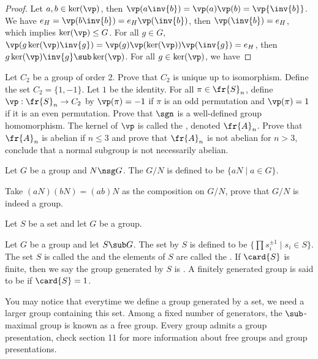 \documentclass[10pt]{article}
\begin{document}
\begin{proof}
    Let $a,b\in\ker(\vp)$, then $\vp(a\inv{b})=\vp(a)\vp(b)=\vp{\inv{b}}$. We have ${e}_{H}=\vp(b\inv{b})={e}_{H}\vp(\inv{b})$, then $\vp({\inv{b}})={e}_{H}$, which implies $\ker(\vp)\le G$. For all $g\in G$, $\vp(g\ker(\vp)\inv{g})=\vp(g)\vp(\ker(\vp))\vp(\inv{g})={e}_{H}$, then $g\ker(\vp)\inv{g}\sub\ker(\vp)$. For all $g\in\ker(\vp)$, we have 
\end{proof}
\begin{problem}
    Let ${C}_{2}$ be a group of order 2. Prove that ${C}_{2}$ is unique up to isomorphism. Define the set ${C}_{2}=\{1,-1\}$. Let $1$ be the identity. For all $\pi\in{\fr{S}}_{n}$, define $\vp:{\fr{S}}_{n}\to{C}_{2}$ by $\vp(\pi)=-1$ if $\pi$ is an odd permutation and $\vp(\pi)=1$ if it is an even permutation. Prove that $\sgn$ is a well-defined group homomorphism. The kernel of $\vp$ is called the , denoted ${\fr{A}}_{n}$. Prove that ${\fr{A}}_{n}$ is abelian if $n\le 3$ and prove that ${\fr{A}}_{n}$ is not abelian for $n>3$, conclude that a normal subgroup is not necessarily abelian.
\end{problem}
\begin{definition}
    Let $G$ be a group and $N\nsg G$. The  $G/N$ is defined to be $\{aN\mid a\in G\}$. 
\end{definition}
\begin{problem}
    Take $(aN)(bN)=(ab)N$ as the composition on $G/N$, prove that $G/N$ is indeed a group.
\end{problem}
\begin{definition}
    Let $S$ be a set and let $G$ be a group. 
\end{definition}
\begin{definition}
    Let $G$ be a group and let $S\sub G$. The set  by $S$ is defined to be $\{\prod{s}_{i}^{\pm 1}\mid{s}_{i}\in S\}$. The set $S$ is called the  and the elements of $S$ are called the . If $\card{S}$ is finite, then we say the group generated by $S$ is . A finitely generated group is said to be  if $\card{S}=1$.
\end{definition}
\par
You may notice that everytime we define a group generated by a set, we need a larger group containing this set. Among a fixed number of generators, the $\sub$-maximal group is known as a free group. Every group admits a group presentation, check section 11 for more information about free groups and group presentations.
\end{document}
